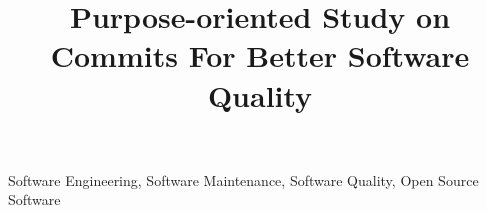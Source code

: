 \documentclass[10pt,conference]{IEEEtran}
\begin{document}
\title{Purpose-oriented Study on Commits For Better Software Quality}

\author{
}

\maketitle

\begin{abstract}

\end{abstract}

\begin{IEEEkeywords}
Software Engineering, Software Maintenance, Software Quality, Open Source Software
\end{IEEEkeywords}












\medskip



\vspace{12pt}
\color{red}
\end{document}
